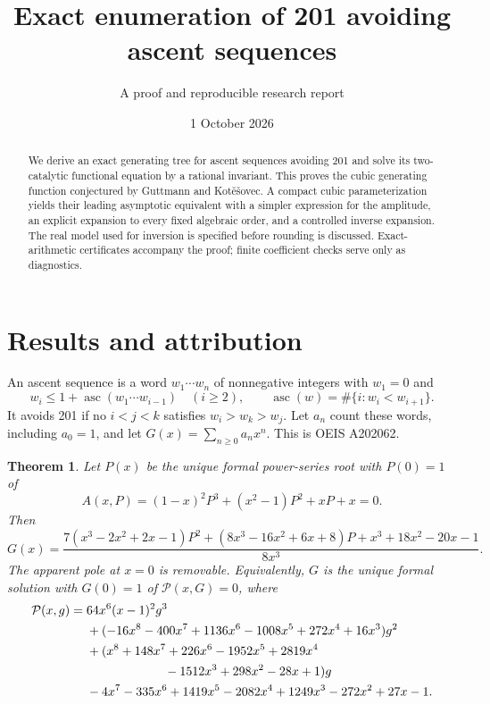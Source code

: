 \documentclass[11pt,letterpaper]{article}
\title{Exact enumeration of 201 avoiding ascent sequences}
\author{A proof and reproducible research report}
\date{1 October 2026}
\newtheorem{theorem}{Theorem}[section]
\theoremstyle{remark}\newtheorem{remark}[theorem]{Remark}
\newcommand{\asc}{\operatorname{asc}}
\begin{document}
\maketitle
\begin{abstract}
We derive an exact generating tree for ascent sequences avoiding 201 and solve its two-catalytic functional equation by a rational invariant. This proves the cubic generating function conjectured by Guttmann and Kot\v{e}\v{s}ovec. A compact cubic parameterization yields their leading asymptotic equivalent with a simpler expression for the amplitude, an explicit expansion to every fixed algebraic order, and a controlled inverse expansion. The real model used for inversion is specified before rounding is discussed. Exact-arithmetic certificates accompany the proof; finite coefficient checks serve only as diagnostics.
\end{abstract}

\section{Results and attribution}\label{a62:sec:results}
An ascent sequence is a word $w_1\cdots w_n$ of nonnegative integers with $w_1=0$ and
\[
 w_i\le 1+\asc(w_1\cdots w_{i-1})\quad(i\ge2),\qquad
 \asc(w)=\#\{i:w_i<w_{i+1}\}.
\]
It avoids 201 if no $i<j<k$ satisfies $w_i>w_k>w_j$. Let $a_n$ count these words, including $a_0=1$, and let $G(x)=\sum_{n\ge0}a_nx^n$. This is OEIS A202062.

\begin{theorem}\label{a62:thm:gf}
Let $P(x)$ be the unique formal power-series root with $P(0)=1$ of
\begin{equation}\label{a62:eq:param}
 A(x,P)=(1-x)^2P^3+(x^2-1)P^2+xP+x=0.
\end{equation}
Then
\begin{equation}\label{a62:eq:Gparam}
G(x)=\frac{7(x^3-2x^2+2x-1)P^2+(8x^3-16x^2+6x+8)P+x^3+18x^2-20x-1}{8x^3}.
\end{equation}
The apparent pole at $x=0$ is removable. Equivalently, $G$ is the unique formal solution with $G(0)=1$ of $\mathcal P(x,G)=0$, where
\begin{align}\label{a62:eq:Gpoly}
\mathcal P(x,g)={}&64x^6(x-1)^2g^3\notag\\
&+(-16x^8-400x^7+1136x^6-1008x^5+272x^4+16x^3)g^2\notag\\
&+(x^8+148x^7+226x^6-1952x^5+2819x^4\notag\\
&\hspace{22mm}-1512x^3+298x^2-28x+1)g\notag\\
&-4x^7-335x^6+1419x^5-2082x^4+1249x^3-272x^2+27x-1.
\end{align}
\end{theorem}
\end{document}

